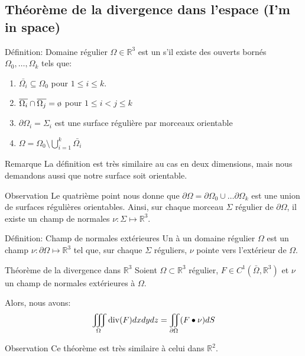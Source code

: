 \documentclass[a4paper]{article}
\begin{document}
\subsection[Théorème de la divergence dans l'espace]{Théorème de la divergence dans l'espace (I'm in space)}
\begin{parag}{Définition: Domaine régulier}
    $\Omega \in \mathbb{R}^3$ est un  s'il existe des ouverts bornés $\Omega_0, \ldots, \Omega_k$ tels que:
    \begin{enumerate}
        \item $\bar{\Omega_i} \subseteq \Omega_0$ pour $1 \leq i \leq k$.
        \item $\bar{\Omega_i} \cap \bar{\Omega_j} = \o$ pour $1 \leq i < j \leq k$
        \item $\partial \Omega_i = \Sigma_i$ est une surface régulière par morceaux orientable
        \item $\Omega = \Omega_0 \setminus \bigcup_{i=1}^k \bar{\Omega_i}$
    \end{enumerate}

    \begin{subparag}{Remarque}
        La définition est très similaire au cas en deux dimensions, mais nous demandons aussi que notre surface soit orientable.
    \end{subparag}

    \begin{subparag}{Observation}
        Le quatrième point nous donne que $\partial \Omega = \partial \Omega_0 \cup\ldots \partial \Omega_k$ est une union de surfaces régulières orientables. Ainsi, sur chaque morceau $\Sigma$ régulier de $\partial \Omega$, il existe un champ de normales $\nu: \Sigma \mapsto \mathbb{R}^3$. 
    \end{subparag}
\end{parag}

\begin{parag}{Définition: Champ de normales extérieures}
    Un  à un domaine régulier $\Omega$ est un champ $\nu: \partial \Omega \mapsto\mathbb{R}^3$ tel que, sur chaque $\Sigma$ réguliers, $\nu$ pointe vers l'extérieur de $\Omega$.
\end{parag}

\begin{parag}{Théorème de la divergence dans $\mathbb{R}^3$}
    Soient $\Omega \subset \mathbb{R}^3$ régulier, $F \in C^1\left(\bar{\Omega}, \mathbb{R}^3\right)$ et $\nu$ un champ de normales extérieures à $\Omega$.

    Alors, nous avons: 
    \[\iiint_{\Omega} \Div\left(F\right) dxdydz = \iint_{\partial \Omega} \left(F \dotprod \nu\right)dS\]
    
    \begin{subparag}{Observation}
        Ce théorème est très similaire à celui dans $\mathbb{R}^2$.
    \end{subparag}
\end{parag}
\end{document}
